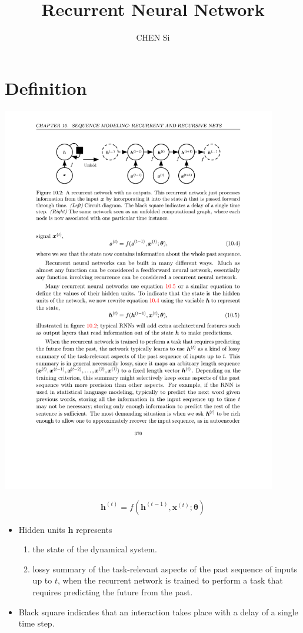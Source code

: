\documentclass[12pt, a4paper]{article}
\title{Recurrent Neural Network}
\author{CHEN Si}
\date{}
\def\vh{\boldsymbol{h}}
\def\vtheta{\boldsymbol{\theta}}
\newcommand{\egvh}[1]{\boldsymbol{h}^{(#1)}}
\newcommand{\egvx}[1]{\boldsymbol{x}^{(#1)}}
\begin{document}
 


\maketitle
\tableofcontents


\section{Definition}
\begin{center}
    \includegraphics[width=0.9\textwidth]{../imgs/Recurrent_Network_without_Outputs.pdf}
\end{center}
\[
    \egvh{t} = f(\egvh{t-1}, \egvx{t};\vtheta)
\]
\begin{itemize}
    \item Hidden units $\vh$ represents
        \begin{enumerate}
            \item the state of the dynamical system.
            \item lossy summary of the task-relevant aspects of the past sequence of inputs up to $t$, when the recurrent network is trained to perform a task that requires predicting the future from the past.
        \end{enumerate}
    \item Black square indicates that an interaction takes place with a delay of a single time step.
\end{itemize}
\end{document}
